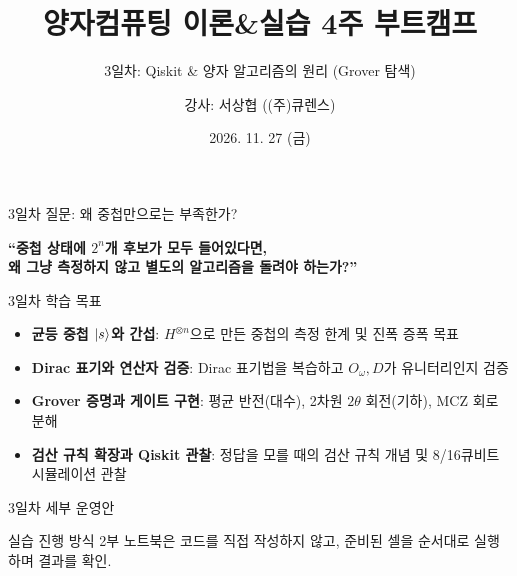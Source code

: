\documentclass[aspectratio=169, 10pt]{beamer}
\title[양자컴퓨팅 부트캠프 3일차]{양자컴퓨팅 이론\&실습 4주 부트캠프}
\subtitle{3일차: Qiskit \& 양자 알고리즘의 원리 (Grover 탐색)}
\author{강사: 서상협 ((주)큐렌스)}
\date{2026. 11. 27 (금)}
\begin{document}
\frame{\titlepage}

\begin{frame}{3일차 질문: 왜 중첩만으로는 부족한가?}
    \begin{center}
        \large \textbf{``중첩 상태에 $2^n$개 후보가 모두 들어있다면,\\왜 그냥 측정하지 않고 별도의 알고리즘을 돌려야 하는가?''}
    \end{center}
    \pause
    \vspace{0.2cm}
    \begin{qcblock}{3일차 학습 목표}
        \begin{itemize}
            \item \textbf{균등 중첩 $|s\rangle$와 간섭}: $H^{\otimes n}$으로 만든 중첩의 측정 한계 및 진폭 증폭 목표
            \pause
            \item \textbf{Dirac 표기와 연산자 검증}: Dirac 표기법을 복습하고 $O_\omega, D$가 유니터리인지 검증
            \pause
            \item \textbf{Grover 증명과 게이트 구현}: 평균 반전(대수), 2차원 $2\theta$ 회전(기하), $\mathrm{MCZ}$ 회로 분해
            \pause
            \item \textbf{검산 규칙 확장과 Qiskit 관찰}: 정답을 모를 때의 검산 규칙 개념 및 8/16큐비트 시뮬레이션 관찰
        \end{itemize}
    \end{qcblock}
\end{frame}

\begin{frame}{3일차 세부 운영안}
    \begin{center}
    \end{center}
    \pause
    \vspace{0.15cm}
    \begin{qctip}{실습 진행 방식}
        2부 노트북은 코드를 직접 작성하지 않고, 준비된 셀을 순서대로 실행하며 결과를 확인.
    \end{qctip}
\end{frame}
\end{document}
